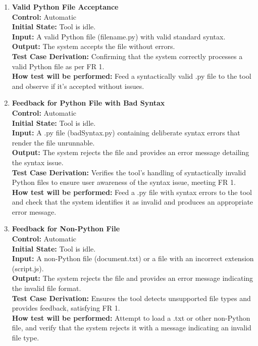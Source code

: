 \documentclass[12pt, titlepage]{article}
\begin{document}
\begin{enumerate}[label={\bf \textcolor{Maroon}{test-FR-IA-\arabic*}}, wide=0pt, font=\itshape]
  \item \textbf{Valid Python File Acceptance} \\[2mm]
    \textbf{Control:} Automatic \\    
    \textbf{Initial State:} Tool is idle.  \\
    \textbf{Input:} A valid Python file (filename.py) with valid standard syntax. \\
    \textbf{Output:} The system accepts the file without errors.\\[2mm]
    \textbf{Test Case Derivation:} Confirming that the system correctly processes a valid Python file as per FR 1.\\[2mm]
    \textbf{How test will be performed:} Feed a syntactically valid .py file to the tool and observe if it’s accepted without issues.
            
  \item \textbf{Feedback for Python File with Bad Syntax} \\[2mm]
    \textbf{Control:} Automatic \\
    \textbf{Initial State:} Tool is idle. \\
    \textbf{Input:} A .py file (badSyntax.py) containing deliberate syntax errors that render the file unrunnable. \\
    \textbf{Output:} The system rejects the file and provides an error message detailing the syntax issue. \\[2mm]
    \textbf{Test Case Derivation:} Verifies the tool’s handling of syntactically invalid Python files to ensure user awareness of the syntax issue, meeting FR 1. \\[2mm]
    \textbf{How test will be performed:} Feed a .py file with syntax errors to the tool and check that the system identifies it as invalid and produces an appropriate error message.

  \item \textbf{Feedback for Non-Python File}\\[2mm]
    \textbf{Control:} Automatic \\
    \textbf{Initial State:} Tool is idle.\\
    \textbf{Input:} A non-Python file (document.txt) or a file with an incorrect extension (script.js).\\
    \textbf{Output:} The system rejects the file and provides an error message indicating the invalid file format.\\[2mm]
    \textbf{Test Case Derivation:} Ensures the tool detects unsupported file types and provides feedback, satisfying FR 1.\\[2mm]
    \textbf{How test will be performed:} Attempt to load a .txt or other non-Python file, and verify that the system rejects it with a message indicating an invalid file type.


\end{enumerate}
\end{document}
